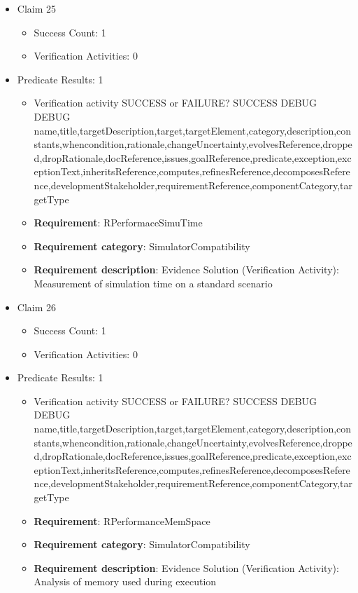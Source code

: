 \documentclass{article}
\begin{document}
\begin{itemize}
  				  \item Claim 25
				\begin{itemize}
			    	\item Success Count: 1 
			    	\item Verification Activities: 0
				\end{itemize}
				
									    
				\item Predicate Results: 1
					\begin{itemize}				
					\item Verification activity SUCCESS or FAILURE? SUCCESS
					DEBUG DEBUG name,title,targetDescription,target,targetElement,category,description,constants,whencondition,rationale,changeUncertainty,evolvesReference,dropped,dropRationale,docReference,issues,goalReference,predicate,exception,exceptionText,inheritsReference,computes,refinesReference,decomposesReference,developmentStakeholder,requirementReference,componentCategory,targetType
					\item \textbf{Requirement}: RPerformaceSimuTime 
					\item \textbf{Requirement category}: SimulatorCompatibility
					\item \textbf{Requirement description}: Evidence Solution (Verification Activity): Measurement of simulation time on a standard scenario
					\end{itemize}

  				  \item Claim 26
				\begin{itemize}
			    	\item Success Count: 1 
			    	\item Verification Activities: 0
				\end{itemize}
				
									    
				\item Predicate Results: 1
					\begin{itemize}				
					\item Verification activity SUCCESS or FAILURE? SUCCESS
					DEBUG DEBUG name,title,targetDescription,target,targetElement,category,description,constants,whencondition,rationale,changeUncertainty,evolvesReference,dropped,dropRationale,docReference,issues,goalReference,predicate,exception,exceptionText,inheritsReference,computes,refinesReference,decomposesReference,developmentStakeholder,requirementReference,componentCategory,targetType
					\item \textbf{Requirement}: RPerformanceMemSpace 
					\item \textbf{Requirement category}: SimulatorCompatibility
					\item \textbf{Requirement description}: Evidence Solution (Verification Activity): Analysis of memory used during execution
					\end{itemize}

			\end{itemize}

		
\end{document}
